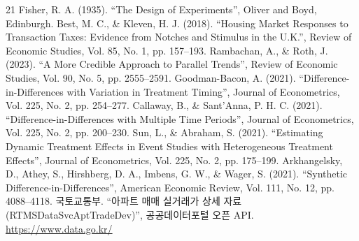 \begin{thebibliography}{21}
  Fisher, R. A. (1935). “The Design of Experiments”, Oliver and Boyd, Edinburgh.
  Best, M. C., \& Kleven, H. J. (2018). “Housing Market Responses to Transaction Taxes: Evidence from Notches and Stimulus in the U.K.”, Review of Economic Studies, Vol. 85, No. 1, pp. 157--193.
  Rambachan, A., \& Roth, J. (2023). “A More Credible Approach to Parallel Trends”, Review of Economic Studies, Vol. 90, No. 5, pp. 2555--2591.
  Goodman-Bacon, A. (2021). “Difference-in-Differences with Variation in Treatment Timing”, Journal of Econometrics, Vol. 225, No. 2, pp. 254--277.
  Callaway, B., \& Sant’Anna, P. H. C. (2021). “Difference-in-Differences with Multiple Time Periods”, Journal of Econometrics, Vol. 225, No. 2, pp. 200--230.
  Sun, L., \& Abraham, S. (2021). “Estimating Dynamic Treatment Effects in Event Studies with Heterogeneous Treatment Effects”, Journal of Econometrics, Vol. 225, No. 2, pp. 175--199.
  Arkhangelsky, D., Athey, S., Hirshberg, D. A., Imbens, G. W., \& Wager, S. (2021). “Synthetic Difference-in-Differences”, American Economic Review, Vol. 111, No. 12, pp. 4088--4118.
  국토교통부. “아파트 매매 실거래가 상세 자료(RTMSDataSvcAptTradeDev)”, 공공데이터포털 오픈 API. \url{https://www.data.go.kr/}
\end{thebibliography}
